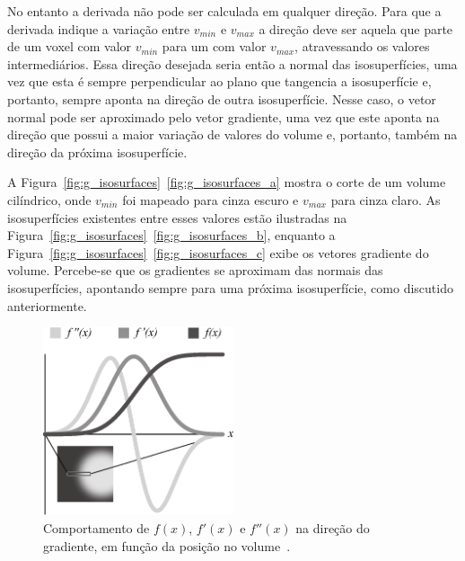 	No entanto a derivada não pode ser calculada em qualquer direção. Para que a derivada indique a variação entre $v_{min}$ e $v_{max}$ a direção deve ser aquela que parte de um voxel com valor $v_{min}$ para um com valor $v_{max}$, atravessando os valores intermediários. Essa direção desejada seria então a normal das isosuperfícies, uma vez que esta é sempre perpendicular ao plano que tangencia a isosuperfície e, portanto, sempre aponta na direção de outra isosuperfície. Nesse caso, o vetor normal pode ser aproximado pelo vetor gradiente, uma vez que este aponta na direção que possui a maior variação de valores do volume e, portanto, também na direção da próxima isosuperfície.
	

	A Figura~\ref{fig:g_isosurfaces}~\ref{fig:g_isosurfaces_a} mostra o corte de um volume cilíndrico, onde $v_{min}$ foi mapeado para cinza escuro e $v_{max}$ para cinza claro. As isosuperfícies existentes entre esses valores estão ilustradas na Figura~\ref{fig:g_isosurfaces}~\ref{fig:g_isosurfaces_b}, enquanto a Figura~\ref{fig:g_isosurfaces}~\ref{fig:g_isosurfaces_c} exibe os vetores gradiente do volume. Percebe-se que os gradientes se aproximam das normais das isosuperfícies, apontando sempre para uma próxima isosuperfície, como discutido anteriormente.
		
\begin{figure}[h]
	\centering
	\includegraphics[width=0.5\textwidth]{images/g_functions_all}
	\caption{Comportamento de $f(x)$, $f'(x)$ e $f''(x)$ na direção do gradiente, em função da posição no volume~\cite{gordon}.}
	\label{fig:g_functions}
\end{figure}
	
